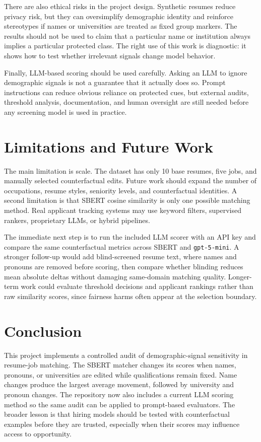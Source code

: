 \documentclass[10pt,twocolumn]{article}
\begin{document}
There are also ethical risks in the project design. Synthetic resumes reduce privacy risk, but they can oversimplify demographic identity and reinforce stereotypes if names or universities are treated as fixed group markers. The results should not be used to claim that a particular name or institution always implies a particular protected class. The right use of this work is diagnostic: it shows how to test whether irrelevant signals change model behavior.

Finally, LLM-based scoring should be used carefully. Asking an LLM to ignore demographic signals is not a guarantee that it actually does so. Prompt instructions can reduce obvious reliance on protected cues, but external audits, threshold analysis, documentation, and human oversight are still needed before any screening model is used in practice.

\section{Limitations and Future Work}
The main limitation is scale. The dataset has only 10 base resumes, five jobs, and manually selected counterfactual edits. Future work should expand the number of occupations, resume styles, seniority levels, and counterfactual identities. A second limitation is that SBERT cosine similarity is only one possible matching method. Real applicant tracking systems may use keyword filters, supervised rankers, proprietary LLMs, or hybrid pipelines.

The immediate next step is to run the included LLM scorer with an API key and compare the same counterfactual metrics across SBERT and \texttt{gpt-5-mini}. A stronger follow-up would add blind-screened resume text, where names and pronouns are removed before scoring, then compare whether blinding reduces mean absolute deltas without damaging same-domain matching quality. Longer-term work could evaluate threshold decisions and applicant rankings rather than raw similarity scores, since fairness harms often appear at the selection boundary.

\section{Conclusion}
This project implements a controlled audit of demographic-signal sensitivity in resume-job matching. The SBERT matcher changes its scores when names, pronouns, or universities are edited while qualifications remain fixed. Name changes produce the largest average movement, followed by university and pronoun changes. The repository now also includes a current LLM scoring method so the same audit can be applied to prompt-based evaluators. The broader lesson is that hiring models should be tested with counterfactual examples before they are trusted, especially when their scores may influence access to opportunity.



\end{document}
